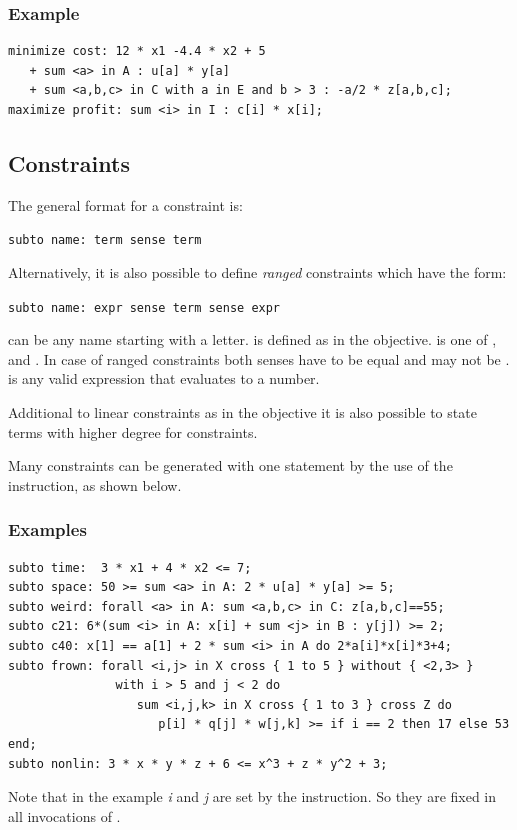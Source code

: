\subsubsection{Example}
{\small
\begin{verbatim}
minimize cost: 12 * x1 -4.4 * x2 + 5
   + sum <a> in A : u[a] * y[a]
   + sum <a,b,c> in C with a in E and b > 3 : -a/2 * z[a,b,c];
maximize profit: sum <i> in I : c[i] * x[i];
\end{verbatim}
}

\subsection{Constraints}\label{ssec:ug:constraints}
The general format for a constraint is:

\smallskip
\verb|subto name: term sense term|

\smallskip
\noindent Alternatively, it is also possible to define \emph{ranged} constraints
which have the form:

\smallskip
\verb|subto name: expr sense term sense expr|

\smallskip
\noindent {} can be any name starting with a letter.  is defined
as in the objective.  is one of
\code{<=}, \code{>=} and \code{==}. In case of ranged constraints
both senses have to be equal and may not be \code{==}.  is any
valid expression that evaluates to a number.

Additional to linear constraints as in the objective it is also
possible to state terms with higher degree for constraints.

Many constraints can be generated with one statement by the use of the
 instruction, as shown below.

\subsubsection{Examples}
{\small
\begin{verbatim}
subto time:  3 * x1 + 4 * x2 <= 7;
subto space: 50 >= sum <a> in A: 2 * u[a] * y[a] >= 5;
subto weird: forall <a> in A: sum <a,b,c> in C: z[a,b,c]==55;
subto c21: 6*(sum <i> in A: x[i] + sum <j> in B : y[j]) >= 2;
subto c40: x[1] == a[1] + 2 * sum <i> in A do 2*a[i]*x[i]*3+4;
subto frown: forall <i,j> in X cross { 1 to 5 } without { <2,3> }
               with i > 5 and j < 2 do
                  sum <i,j,k> in X cross { 1 to 3 } cross Z do
                     p[i] * q[j] * w[j,k] >= if i == 2 then 17 else 53 end;
subto nonlin: 3 * x * y * z + 6 <= x^3 + z * y^2 + 3;
\end{verbatim}
}
\noindent Note that in the example \emph{i} and \emph{j} are set by the 
instruction. So they are fixed in all invocations of .

